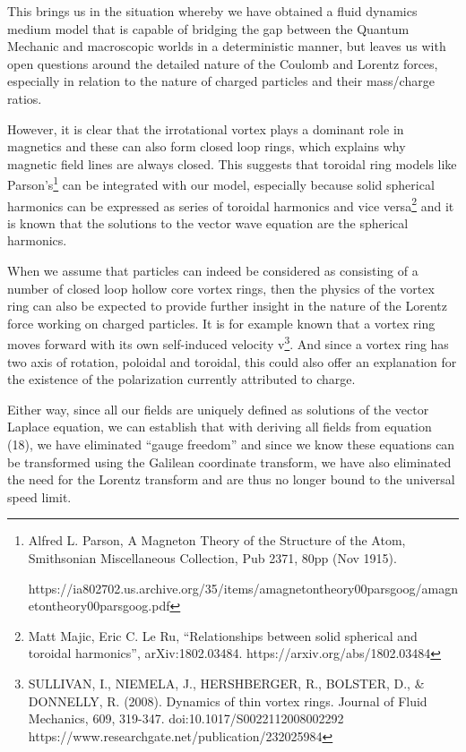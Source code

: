 \documentclass{article}
\begin{document}
This brings us in the situation whereby we have obtained a fluid dynamics medium model that is capable of bridging the
gap between the Quantum Mechanic and macroscopic worlds in a deterministic manner, but leaves us with open questions
around the detailed nature of the Coulomb and Lorentz forces, especially in relation to the nature of charged particles
and their mass/charge ratios. 

However, it is clear that the irrotational vortex plays a dominant role in magnetics and these can also form closed loop
rings, which explains why magnetic field lines are always closed. This suggests that toroidal ring models like
Parson's\footnote{Alfred L. Parson, {\textquotedbl}A Magneton Theory of the Structure of the Atom{\textquotedbl},
Smithsonian Miscellaneous Collection, Pub 2371, 80pp (Nov 1915).  \par
https://ia802702.us.archive.org/35/items/amagnetontheory00parsgoog/amagnetontheory00parsgoog.pdf\par }  can be
integrated with our model, especially because solid spherical harmonics can be expressed as series of toroidal
harmonics and vice versa\footnote{ Matt Majic, Eric C. Le Ru, ``Relationships between solid spherical and toroidal
harmonics'', arXiv:1802.03484. https://arxiv.org/abs/1802.03484\par } and it is known that the solutions to the vector
wave equation are the spherical harmonics.

When we assume that particles can indeed be considered as consisting of a number of closed loop hollow core vortex
rings, then the physics of the vortex ring can also be expected to provide further insight in the nature of the Lorentz
force working on charged particles. It is for example known that a vortex ring moves forward with its own self-induced
velocity v\footnote{ SULLIVAN, I., NIEMELA, J., HERSHBERGER, R., BOLSTER, D., \& DONNELLY, R. (2008). Dynamics of thin
vortex rings. Journal of Fluid Mechanics, 609, 319-347. doi:10.1017/S0022112008002292 
https://www.researchgate.net/publication/232025984 \par }. And since a vortex ring has two axis of rotation, poloidal
and toroidal, this could also offer an explanation for the existence of the polarization currently attributed to
charge.  

Either way, since all our fields are uniquely defined as solutions of the vector Laplace equation, we can establish that
with deriving all fields from equation (18), we have eliminated ``gauge freedom'' and since we know these equations can
be transformed using the Galilean coordinate transform, we have also eliminated the need for the Lorentz transform and
are thus no longer bound to the universal speed limit.
\end{document}
